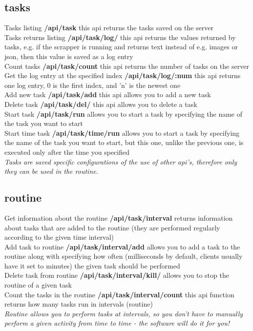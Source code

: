 \documentclass{article}
\begin{document}
\subsection{tasks}
Tasks listing \textbf{/api/task} this api returns the tasks saved on the server\\
Tasks returns listing \textbf{/api/task/log/} this api returns the values returned by tasks, e.g. if the scrapper is running and returns text instead of e.g. images or json, then this value is saved as a log entry\\
Count tasks \textbf{/api/task/count} this api returns the number of tasks on the server\\
Get the log entry at the specified index \textbf{/api/task/log/:num} this api returns one log entry, 0 is the first index, and 'n' is the newest one\\
Add new task \textbf{/api/task/add} this api allows you to add a new task\\
Delete task \textbf{/api/task/del/} this api allows you to delete a task\\
Start task \textbf{/api/task/run} allows you to start a task by specifying the name of the task you want to start\\
Start time task \textbf{/api/task/time/run} allows you to start a task by specifying the name of the task you want to start, but this one, unlike the previous one, is executed only after the time you specified\\
\textit{Tasks are saved specific configurations of the use of other api's, therefore only they can be used in the routine.}
\subsection{routine}
Get information about the routine \textbf{/api/task/interval} returns information about tasks that are added to the routine (they are performed regularly according to the given time interval)\\
Add task to routine \textbf{/api/task/interval/add} allows you to add a task to the routine along with specifying how often (milliseconds by default, clients usually have it set to minutes) the given task should be performed\\
Delete task from routine \textbf{/api/task/interval/kill/} allows you to stop the routine of a given task\\
Count the tasks in the routine \textbf{/api/task/interval/count} this api function returns how many tasks run in intervals (routine)\\
\textit{Routine allows you to perform tasks at intervals, so you don't have to manually perform a given activity from time to time - the software will do it for you!}
\end{document}
